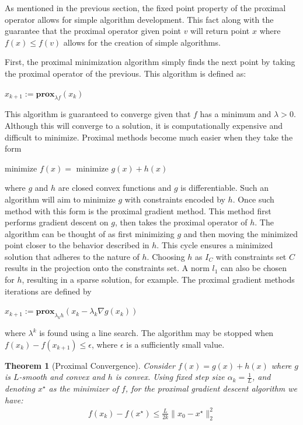 \documentclass[10pt]{article} %
\newtheorem{theorem}{Theorem}
\begin{document}
As mentioned in the previous section, the fixed point property of the proximal operator allows for simple algorithm development. This fact along with the guarantee that the proximal operator given point $v$ will return point $x$ where $f(x) \leq f(v)$ allows for the creation of simple algorithms. 

First, the proximal minimization algorithm simply finds the next point by taking the proximal operator of the previous. This algorithm is defined as:

\begin{center}
    $x_{k+1} := \mathbf{prox}_{\lambda f} (x_k)$
\end{center}

\noindent This algorithm is guaranteed to converge given that $f$ has a minimum and $\lambda > 0$. Although this will converge to a solution, it is computationally expensive and difficult to minimize. Proximal methods become much easier when they take the form 


\begin{center}
    minimize $f(x) =$ minimize $g(x) + h(x)$
\end{center}

\noindent where $g$ and $h$ are closed convex functions and $g$ is differentiable. Such an algorithm will aim to minimize $g$ with constraints encoded by $h$.  Once such method with this form is the proximal gradient method. This method first performs gradient descent on $g$, then takes the proximal operator of $h$. The algorithm can be thought of as first minimizing $g$ and then moving the minimized point closer to the behavior described in $h$. This cycle ensures a minimized solution that adheres to the nature of $h$. Choosing $h$ as $I_C$ with constraints set $C$ results in the projection onto the constraints set. A norm $l_1$ can also be chosen for $h$, resulting in a sparse solution, for example. The proximal gradient methods iterations are defined by

\begin{center}
    $x_{k+1} := \mathbf{prox}_{\lambda_k h} (x_k - \lambda _ k \nabla g (x_k))$
\end{center}

\noindent where $\lambda^k$ is found using a line search. The algorithm may be stopped when $f(x_k) - f(x_{k+1}) \leq \epsilon$, where $\epsilon$ is a sufficiently small value. 
\begin{theorem}[Proximal Convergence]
        Consider $f(x)=g(x)+h(x)$ where $g$ is $L$-smooth and convex and $h$ is convex. Using fixed step size $\alpha_k=\frac{1}{L}$, and denoting $x^\star$ as the minimizer of $f$, for the proximal gradient descent algorithm we have:
        \begin{align*}
            f(x_k)-f(x^\star)\leq\frac{L}{2k}\|x_0-x^\star\|_2^2
        \end{align*}
    \end{theorem}
\end{document}
